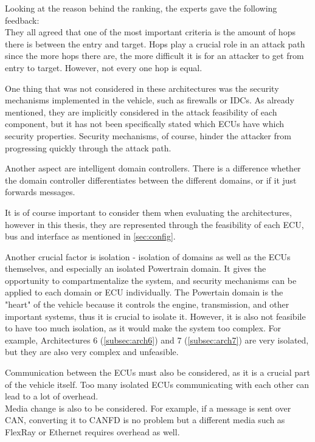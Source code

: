 Looking at the reason behind the ranking, the experts gave the following feedback:\\

They all agreed that one of the most important criteria is the amount of hops there is between the entry and target.
Hops play a crucial role in an attack path since the more hops there are, the more difficult it is for an attacker to get from entry to target.
However, not every one hop is equal.

One thing that was not considered in these architectures was the security mechanisms implemented in the vehicle, such as firewalls or IDCs.
As already mentioned, they are implicitly considered in the attack feasibility of each component, 
but it has not been specifically stated which ECUs have which security properties.
Security mechanisms, of course, hinder the attacker from progressing quickly through the attack path.

Another aspect are intelligent domain controllers. 
There is a difference whether the domain controller differentiates between the different domains, or if it just forwards messages.

It is of course important to consider them when evaluating the architectures, however in this thesis, 
they are represented through the feasibility of each ECU, bus and interface as mentioned in \ref{sec:config}.

Another crucial factor is isolation - isolation of domains as well as the ECUs themselves, and especially an isolated Powertrain domain.
It gives the opportunity to compartmentalize the system, and security mechanisms can be applied to each domain or ECU individually.
The Powertain domain is the "heart" of the vehicle because it controls the engine, transmission, and other important systems, thus it is crucial to isolate it.
However, it is also not feasibile to have too much isolation, as it would make the system too complex.
For example, Architectures 6 (\ref{subsec:arch6}) and 7 (\ref{subsec:arch7}) are very isolated, but they are also very complex and unfeasible.

Communication between the ECUs must also be considered, as it is a crucial part of the vehicle itself. 
Too many isolated ECUs communicating with each other can lead to a lot of overhead.\\
Media change is also to be considered. 
For example, if a message is sent over CAN, converting it to CANFD is no problem but a different media such as FlexRay or Ethernet requires overhead as well.\\

